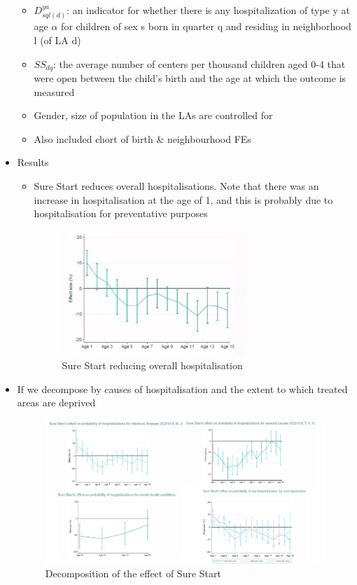 \begin{itemize}
\begin{itemize}
    \item $D^{ya}_{sql(d)}$: an indicator for whether there is any hospitalization of type y at
age $\alpha$ for children of sex s born in quarter q and residing in neighborhood l (of LA d)
\item  $SS_{dq}$: the average number
of centers per thousand children aged 0-4 that were open between the child’s birth and the age at
which the outcome is measured
\item Gender, size of population in the LAs are controlled for
\item Also included chort of birth \& neighbourhood FEs
\end{itemize}
\item Results
\begin{itemize}
    \item Sure Start reduces overall hospitalisations. Note that there was an increase in hospitalisation at the age of 1, and this is probably due to hospitalisation for preventative purposes
            \begin{figure}[H]%
    \centering
    \includegraphics[width=7cm]{images/ch4/SS_overall.png}
    \caption{Sure Start reducing overall hospitalisation}
    \end{figure}
    \end{itemize}
\item If we decompose by causes of hospitalisation and the extent to which treated areas are deprived
            \begin{figure}[H]%
    \centering
    \includegraphics[width=14.9cm]{images/ch4/SS_bycauseandregion.png}
    \caption{Decomposition of the effect of Sure Start}
    \end{figure}
    \begin{itemize}
        

\end{itemize}
\end{itemize}
